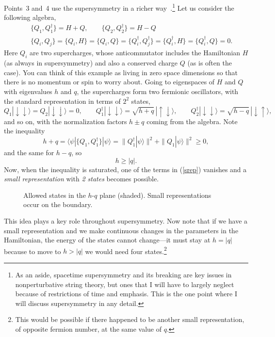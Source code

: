 Points~3 and~4 use the supersymmetry in a richer
way~\cite{WO}.\footnote{As an aside, spacetime supersymmetry and its
breaking are key issues in nonperturbative string theory, but ones
that I will have to largely neglect because of restrictions of time
and emphasis.  This is the one point where I will discuss
supersymmetry in any detail.}  Let us consider the following algebra,
\begin{eqnarray}
&&\{ Q_1, Q_1^\dagger \} = H + Q, \qquad \{ Q_2, Q_2^\dagger \} 
= H - Q \nonumber\\
&&\{ Q_i, Q_j \} = \{ Q_i, H \} = \{ Q_i, Q \} = 
\{ Q^\dagger_i, Q^\dagger_j \} = \{ Q^\dagger_i, H \}
= \{ Q^\dagger_i, Q \} = 0.
\end{eqnarray}
Here $Q_i$ are two supercharges, whose anticommutator includes the
Hamiltonian $H$ (as always in supersymmetry) and also a conserved
charge $Q$ (as is often the case).  You can think of this example as
living in zero space dimensions so
that there is no momentum or spin to worry about.  Going to
eigenspaces of $H$ and $Q$ with eigenvalues $h$ and $q$, the
supercharges form two fermionic oscillators, with the standard
representation in terms of $2^2$ states,
\begin{equation}
Q_1 |\! \downarrow\downarrow \rangle =
Q_2 |\! \downarrow\downarrow \rangle = 0, \qquad
Q^\dagger_1 |\! \downarrow\downarrow \rangle =
\sqrt{h+q}\, |\! \uparrow\downarrow \rangle, \qquad
Q^\dagger_2 |\! \downarrow\downarrow \rangle =
\sqrt{h-q}\, |\! \downarrow\uparrow \rangle, \label{srep}
\end{equation}
and so on, with the normalization factors $h \pm q$ coming from the
algebra.  Note the inequality
\begin{equation}
h + q = \langle \psi | \{ Q_1, Q_1^\dagger \} | \psi \rangle
= \| Q_1^\dagger  | \psi \rangle \|^2 +
\| Q_1 | \psi \rangle \|^2 \geq 0,
\end{equation}
and the same for $h - q$, so 
\begin{equation}
h \geq |q|.
\end{equation}
Now, when the inequality is saturated, one of the terms in
(\ref{srep}) vanishes and a {\it small representation} with {\it 2
states} becomes possible.
\begin{figure}
\begin{center}
\leavevmode
{}
\end{center}
\caption[]{Allowed states in the $h$-$q$ plane (shaded).  Small
representations occur on the boundary.}
\end{figure}
This idea plays a key role
throughout supersymmetry.  Now note that if we have a small
representation and we make continuous changes in the parameters
in the Hamiltonian, the energy of the states cannot change---it must
stay at $h = |q|$ because to move to $h > |q|$ we would need four
states.\footnote{This would be possible if there happened to be
another small representation, of opposite fermion number, at the same
value of $q$.}

